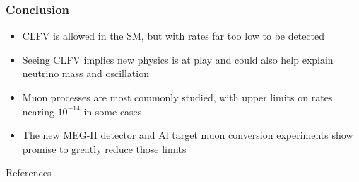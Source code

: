 \documentclass[11pt]{beamer}
\begin{document}
\begin{frame}
    \frametitle{Conclusion}
    \begin{itemize}
        \item CLFV is allowed in the SM, but with rates far too low to be detected
        \item Seeing CLFV implies new physics is at play and could also help explain neutrino mass and oscillation
        \item Muon processes are most commonly studied, with upper limits on rates nearing $10^{-14}$ in some cases
        \item The new MEG-II detector and Al target muon conversion experiments show promise to greatly reduce those limits
    \end{itemize}
    

\end{frame}

\begin{frame}[allowframebreaks]{References} 
    \nocite{*}
    
    
\end{frame}
\end{document}
